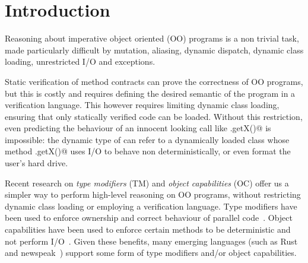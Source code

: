 
\section{Introduction}
\saveSpace\saveSpace

Reasoning about imperative object oriented (OO) programs is a non trivial task,
made particularly difficult by mutation, aliasing, dynamic dispatch, dynamic class loading,
unrestricted I/O and exceptions.

Static verification of method contracts can prove the correctness of OO programs, but this is costly and requires defining the desired semantic of the program in a verification language.
This however requires limiting dynamic class loading, ensuring that only statically verified code can be loaded.
Without this restriction, even predicting the behaviour of an innocent looking call like 
\Q@myPoint.getX()@ is impossible: the dynamic type of \Q@myPoint@ can refer to a dynamically loaded class
whose method \Q@.getX()@ uses I/O to behave non deterministically, or even format the user’s hard drive.

Recent research on \emph{type modifiers} (TM) and \emph{object capabilities} (OC) offer us a simpler way to perform high-level reasoning on OO programs, without restricting dynamic class loading or employing a verification language.
Type modifiers have been used to enforce ownership and  correct behaviour of parallel code~\cite{GordonEtAl12,clebsch2015deny,clebsch2017orca}. Object capabilities have been used to enforce certain methods to be deterministic and not perform I/O~\cite{finifter2008verifiable}.
Given these benefits, many emerging languages (such as Rust~\cite{matsakis2014rust} and newspeak~\cite{bracha2010modules})
support some form of type modifiers and/or object capabilities.

